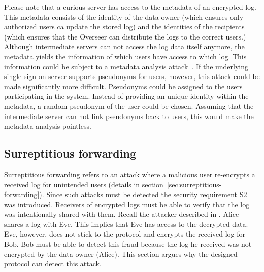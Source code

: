 \documentclass[../main.tex]{subfiles}
\begin{document}
Please note that a curious server has access to the metadata of an encrypted log.
This metadata consists of the identity of the data owner (which ensures only authorized users ca update the stored log) and the identities of the recipients (which ensures that the Overseer can distribute the logs to the correct users.)
Although intermediate servers can not access the log data itself anymore, the metadata yields the information of which users have access to which log.
This information could be subject to a metadata analysis attack~\cite{Greschbach2012,Mayer2016}.
If the underlying single-sign-on server supports pseudonyms for users, however, this attack could be made significantly more difficult.
Pseudonyms could be assigned to the users participating in the system.
Instead of providing an unique identity within the metadata, a random pseudonym of the user could be chosen.
Assuming that the intermediate server can not link pseudonyms back to users, this would make the metadata analysis pointless.

\subsection{Surreptitious forwarding}
Surreptitious forwarding refers to an attack where a malicious user re-encrypts a received log for unintended users (details in section~\ref{sec:surreptitious-forwarding}).
Since such attacks must be detected the security requirement S2 was introduced.
Receivers of encrypted logs must be able to verify that the log was intentionally shared with them.
Recall the attacker described in .
Alice shares a log with Eve.
This implies that Eve has access to the decrypted data.
Eve, however, does not stick to the protocol and encrypts the received log for Bob.
Bob must be able to detect this fraud because the log he received was not encrypted by the data owner (Alice).
This section argues why the designed protocol can detect this attack.
\end{document}
